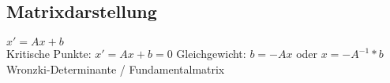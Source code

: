 \subsection{Matrixdarstellung}
$x' = Ax + b$\\
Kritische Punkte: $x' = Ax + b = 0$ Gleichgewicht: $b = -Ax$ oder $x = -A^{-1}*b$
Wronzki-Determinante / Fundamentalmatrix 